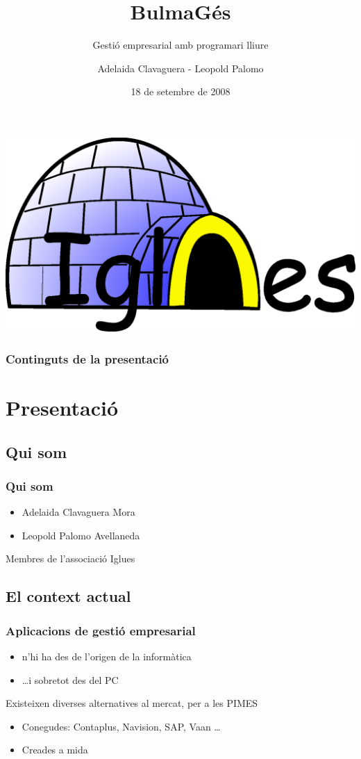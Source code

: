 \documentclass{beamer}
\title{BulmaGés}
\subtitle{Gestió empresarial amb programari lliure}
\author{Adelaida Clavaguera - Leopold Palomo}
\date{18 de setembre de 2008}
\institute{\begin{large}Associació Iglues\end{large} \\
 Volcànica.cat LAN Party 2008 \\ Les Preses }
\begin{document}


\begin{frame}
\titlepage
\begin{overprint}
\includegraphics[scale=0.1]{iglues.eps}
\end{overprint}

\end{frame}

\begin{frame}\frametitle{Continguts de la presentació}
\tableofcontents[hideallsubsections]
\end{frame} 


\section{Presentació} 
\subsection{Qui som}
\begin{frame}\frametitle{Qui som} 
\begin{itemize}
\item Adelaida Clavaguera Mora
\item Leopold Palomo Avellaneda
\end{itemize} 
Membres de l'associació Iglues
\end{frame}

\subsection{El context actual}
\begin{frame}\frametitle{Aplicacions de gestió empresarial} 
\begin{itemize}
\item n'hi ha des de l'origen de la informàtica
\item \dots i sobretot des del PC
\end{itemize} 
Existeixen diverses alternatives al mercat, per a les PIMES
\begin{itemize}
\item Conegudes: Contaplus, Navision, SAP, Vaan \dots
\item Creades a mida
\end{itemize} 
\end{frame}
\end{document}
